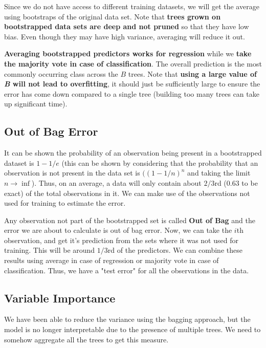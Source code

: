 \documentclass[../statistical_learning_notes.tex]{subfiles}
\begin{document}
    Since we do not have access to different training datasets, we will get the average using bootstraps of the original data set. Note that \textbf{trees grown on bootstrapped data sets are deep and not pruned} so that they have low bias. Even though they may have high variance, averaging will reduce it out.\newline

    \textbf{Averaging bootstrapped predictors works for regression} while we \textbf{take the majority vote in case of classification}. The overall prediction is the most commonly occurring class across the $B$ trees. Note that \textbf{using a large value of \emph{B} will not lead to overfitting}, it should just be sufficiently large to ensure the error has come down compared to a single tree (building too many trees can take up significant time).
    

    \subsection{Out of Bag Error}\label{sec:oob_error}
    It can be shown the probability of an observation being present in a bootstrapped dataset is $1 - 1/e$ (this can be shown by considering that the probability that an observation is not present in the data set is $((1 - 1/n)^{n}$ and taking the limit $n \to \inf$). Thus, on an average, a data will only contain about $2/3$rd ($0.63$ to be exact) of the total observations in it. We can make use of the observations not used for training to estimate the error.\newline

    Any observation not part of the bootstrapped set is called \textbf{Out of Bag} and the error we are about to calculate is out of bag error. Now, we can take the $i$th observation, and get it's prediction from the sets where it was not used for training. This will be around $1/3$rd of the predictors. We can combine these results using average in case of regression or majority vote in case of classification. Thus, we have a "test error" for all the observations in the data.

    
    \subsection{Variable Importance}
    We have been able to reduce the variance using the bagging approach, but the model is no longer interpretable due to the presence of multiple trees. We need to somehow aggregate all the trees to get this measure.\newline
\end{document}
